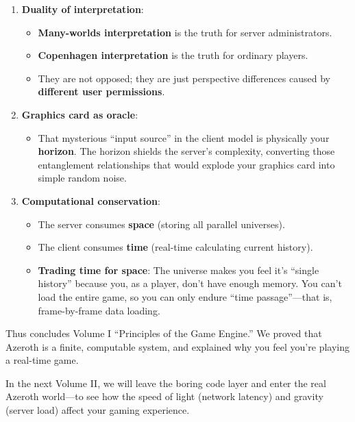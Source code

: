 \begin{enumerate}
\item \textbf{Duality of interpretation}:
\begin{itemize}
\item \textbf{Many-worlds interpretation} is the truth for server administrators.
\item \textbf{Copenhagen interpretation} is the truth for ordinary players.
\item They are not opposed; they are just perspective differences caused by \textbf{different user permissions}.
\end{itemize}

\item \textbf{Graphics card as oracle}:
\begin{itemize}
\item That mysterious ``input source'' in the client model is physically your \textbf{horizon}. The horizon shields the server's complexity, converting those entanglement relationships that would explode your graphics card into simple random noise.
\end{itemize}

\item \textbf{Computational conservation}:
\begin{itemize}
\item The server consumes \textbf{space} (storing all parallel universes).
\item The client consumes \textbf{time} (real-time calculating current history).
\item \textbf{Trading time for space}: The universe makes you feel it's ``single history'' because you, as a player, don't have enough memory. You can't load the entire game, so you can only endure ``time passage''---that is, frame-by-frame data loading.
\end{itemize}
\end{enumerate}

Thus concludes Volume I ``Principles of the Game Engine.'' We proved that Azeroth is a finite, computable system, and explained why you feel you're playing a real-time game.

In the next Volume II, we will leave the boring code layer and enter the real Azeroth world---to see how the speed of light (network latency) and gravity (server load) affect your gaming experience.
